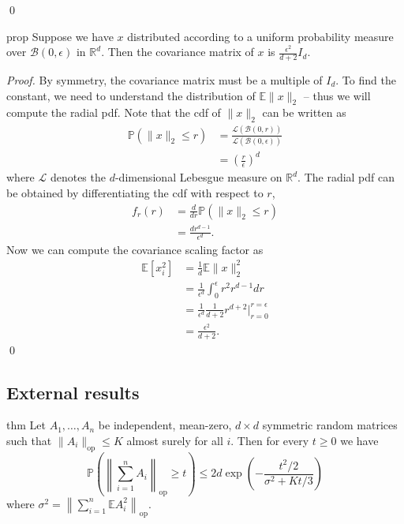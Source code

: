 \documentclass[11pt]{article}
\begin{document}
\qed{}



\begin{restatable}{prop}{} \label{prop: spherical cov}
    Suppose we have $x$ distributed according to a uniform probability measure over $\mathcal{B}(0,\epsilon)$ in $\mathbb{R}^d$. Then the covariance matrix of $x$ is $\frac{\epsilon^2}{d+2}I_d$. 
\end{restatable}
\noindent \textit{Proof.} By symmetry, the covariance matrix must be a multiple of $I_d$. To find the constant, we need to understand the distribution of $\mathbb{E}\|x\|_2$ -- thus we will compute the radial pdf. Note that the cdf of $\|x\|_2$ can be written as
\begin{align*}
    \mathbb{P}(\|x\|_2 \leq r) &= \frac{\mathcal{L}(\mathcal{B}(0,r))}{\mathcal{L}(\mathcal{B}(0,\epsilon))} \\
    &= \left(\frac{r}{\epsilon }\right)^d
\end{align*}
where $\mathcal{L}$ denotes the $d$-dimensional Lebesgue measure on $\mathbb{R}^d$. The radial pdf can be obtained by differentiating the cdf with respect to $r$,
\begin{align*}
    f_r(r) &= \frac{d}{dr}\mathbb{P}(\|x\|_2\leq r) \\
    &= \frac{dr^{d-1}}{\epsilon^d}.
\end{align*}
Now we can compute the covariance scaling factor as 
\begin{align}
    \mathbb{E}[x_i^2] &= \frac{1}{d}\mathbb{E}\|x\|_2^2 \\
    &=\frac{1}{\epsilon^d}\int_{0}^{\epsilon}r^2r^{d-1}dr \\
    &= \frac{1}{\epsilon^d}\frac{1}{d+2}r^{d+2} \Bigg|^{r=\epsilon}_{r=0} \\
    &= \frac{\epsilon^2}{d+2}. \label{eq: uniform eps-ball coordinate variance}
\end{align}
\qed{}

\subsection{External results}

\begin{restatable}{thm}{}
    Let $A_1, \dots, A_n$ be independent, mean-zero, $d\times d$ symmetric random matrices such that $\|A_i\|_{\text{op}} \leq K$ almost surely for all $i$. Then for every $t \geq 0$ we have
    \[\mathbb{P}\left(\left\|\sum_{i = 1}^nA_i\right\|_{\text{op}} \geq t\right) \leq 2d\exp\left(-\frac{t^2/2}{\sigma^2 + Kt/3}\right)\]
    where $\sigma^2 = \left\|\sum_{i = 1}^n\mathbb{E}A_i^2\right\|_{\text{op}}$. \label{thm: matrix bernstein}
\end{restatable}
\end{document}
